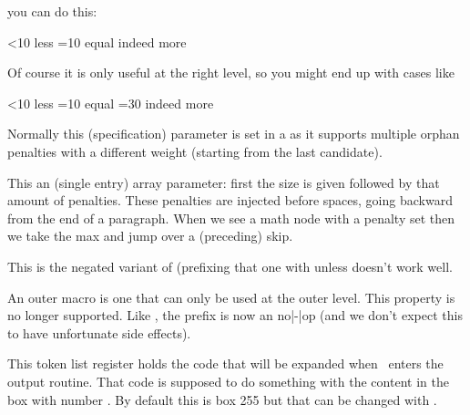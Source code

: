 you can do this:

\starttyping
\ifnum{}<10
    less
\orelse\ifnum{}=10
    equal
    \quitcondition
    indeed
\else
    more
\fi
\stoptyping

Of course it is only useful at the right level, so you might end up with cases like

\starttyping
\ifnum{}<10
    less
\orelse\ifnum{}=10
    equal
    \ifnum{}=30
        \expandafter\quitcondition
    \fi
    indeed
\else
    more
\fi
\stoptyping

\stopnewprimitive

\startnewprimitive[title={\prm {orphanlinefactors}}]

Normally this (specification) parameter is set in a  as it
supports multiple orphan penalties with a different weight (starting from the
last candidate).

\stopnewprimitive

\startnewprimitive[title={\prm {orphanpenalties}}]

This an (single entry) array parameter: first the size is given followed by that
amount of penalties. These penalties are injected before spaces, going backward
from the end of a paragraph. When we see a math node with a penalty set then we
take the max and jump over a (preceding) skip.

\stopnewprimitive

\startnewprimitive[title={\prm {orunless}}]

This is the negated variant of  (prefixing that one with \tex
{unless} doesn't work well.

\stopnewprimitive

\startoldprimitive[title={\prm {outer}}][obsolete=yes]

An outer macro is one that can only be used at the outer level. This property is
no longer supported. Like , the  prefix is now an
no|-|op (and we don't expect this to have unfortunate side effects).

\stopoldprimitive

\startoldprimitive[title={\prm {output}}]

This token list register holds the code that will be expanded when \TEX\ enters
the output routine. That code is supposed to do something with the content in
the box with number . By default this is box 255 but that can be
changed with .

\stopoldprimitive

